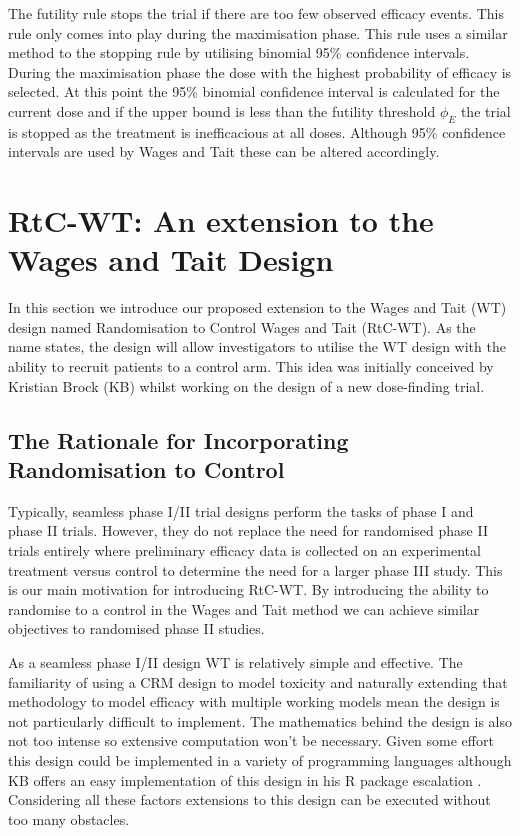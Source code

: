 The futility rule stops the trial if there are too few observed efficacy events. This rule only comes into play during the maximisation phase. This rule uses a similar method to the stopping rule by utilising binomial 95\% confidence intervals. During the maximisation phase the dose with the highest probability of efficacy is selected. At this point the 95\% binomial confidence interval is calculated for the current dose and if the upper bound is less than the futility threshold $\phi_E$ the trial is stopped as the treatment is inefficacious at all doses. Although 95\% confidence intervals are used by Wages and Tait these can be altered accordingly. 


\section{RtC-WT: An extension to the Wages and Tait Design}
\label{WT:RtC-WT}
 
In this section we introduce our proposed extension to the Wages and Tait (WT) design named Randomisation to Control Wages and Tait (RtC-WT). As the name states, the design will allow investigators to utilise the WT design with the ability to recruit patients to a control arm. This idea was initially conceived by Kristian Brock (KB) whilst working on the design of a new dose-finding trial.  

\subsection{The Rationale for Incorporating Randomisation to Control}
\label{WT:Rationale-for-RtC-WT}
 
Typically, seamless phase \RN{1}/\RN{2} trial designs perform the tasks of phase \RN{1} and phase \RN{2} trials. However, they do not replace the need for randomised phase \RN{2} trials entirely where preliminary efficacy data is collected on an experimental treatment versus control to determine the need for a larger phase \RN{3} study. This is our main motivation for introducing RtC-WT. By introducing the ability to randomise to a control in the Wages and Tait method we can achieve similar objectives to randomised phase \RN{2} studies. 
 
As a seamless phase \RN{1}/\RN{2} design WT is relatively simple and effective. The familiarity of using a CRM design to model toxicity and naturally extending that methodology to model efficacy with multiple working models mean the design is not particularly difficult to implement. The mathematics behind the design is also not too intense so extensive computation won't be necessary. Given some effort this design could be implemented in a variety of programming languages although KB offers an easy implementation of this design in his R package escalation \cite{brockModularApproachDose2020}. Considering all these factors extensions to this design can be executed without too many obstacles.

